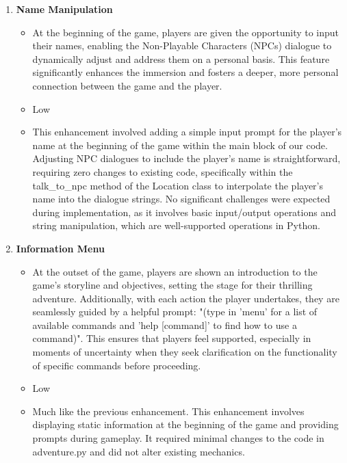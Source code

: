 \documentclass[11pt]{article}
\begin{document}
\begin{enumerate}
\begin{itemize}
	\end{itemize}
 \item \textbf{Name Manipulation}
	\begin{itemize}
	\item At the beginning of the game, players are given the opportunity to input their names, enabling the Non-Playable Characters (NPCs) dialogue to dynamically adjust and address them on a personal basis. This feature significantly enhances the immersion and fosters a deeper, more personal connection between the game and the player.
	\item Low
	\item This enhancement involved adding a simple input prompt for the player's name at the beginning of the game within the main block of our code. Adjusting NPC dialogues to include the player's name is straightforward, requiring zero changes to existing code, specifically within the talk\_to\_npc method of the Location class to interpolate the player's name into the dialogue strings. No significant challenges were expected during implementation, as it involves basic input/output operations and string manipulation, which are well-supported operations in Python.
	\end{itemize}
 \item \textbf{Information Menu}
	\begin{itemize}
	\item At the outset of the game, players are shown an introduction to the game's storyline and objectives, setting the stage for their thrilling adventure. Additionally, with each action the player undertakes, they are seamlessly guided by a helpful prompt: "(type in 'menu' for a list of available commands and 'help [command]' to find how to use a command)". This ensures that players feel supported, especially in moments of uncertainty when they seek clarification on the functionality of specific commands before proceeding.
	\item Low
	\item Much like the previous enhancement. This enhancement involves displaying static information at the beginning of the game and providing prompts during gameplay. It required minimal changes to the code in adventure.py and did not alter existing mechanics.

	\end{itemize}
\end{enumerate}
\end{document}
